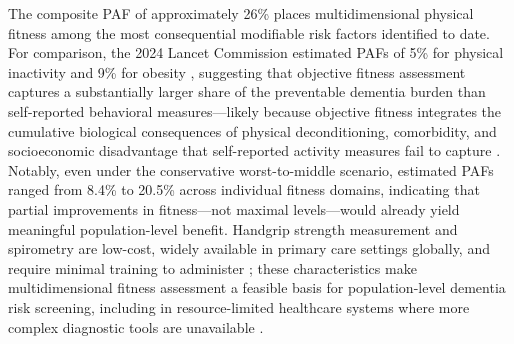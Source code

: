 \documentclass{article}
\begin{document}
The composite PAF of approximately 26\% places multidimensional physical 
fitness among the most consequential modifiable risk factors identified 
to date.
For comparison, the 2024 Lancet Commission estimated PAFs of 5\% for 
physical inactivity and 9\% for obesity \citep{livingston2024dementia}, 
suggesting that objective fitness assessment captures a substantially 
larger share of the preventable dementia burden than self-reported 
behavioral measures—likely because objective fitness integrates the 
cumulative biological consequences of physical deconditioning, 
comorbidity, and socioeconomic disadvantage that self-reported activity 
measures fail to capture \citep{shephard2003limits}.
Notably, even under the conservative worst-to-middle scenario, estimated 
PAFs ranged from 8.4\% to 20.5\% across individual fitness domains, 
indicating that partial improvements in fitness—not maximal levels—would 
already yield meaningful population-level benefit.
Handgrip strength measurement and spirometry are low-cost, widely available 
in primary care settings globally, and require minimal training to 
administer \citep{bohannon2019grip, miller2005spirometry}; these 
characteristics make multidimensional fitness assessment a feasible 
basis for population-level dementia risk screening, including in 
resource-limited healthcare systems where more complex diagnostic tools 
are unavailable \citep{paddick2013dementia}.
\end{document}
